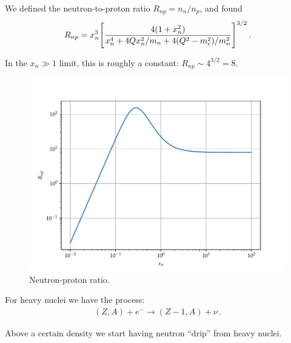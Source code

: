 \documentclass[main.tex]{subfiles}
\begin{document}

We defined the neutron-to-proton ratio \(R_{np} = n_n / n_p\), and found 
%
\begin{align}
R_{np} = x_n^3 \qty[\frac{4 (1 + x_n^2)}{x_n^4 + 4 Q x_n^2 / m_n + 4 (Q^2- m_e^2) / m_n^2}]^{3/2}
\,.
\end{align}

In the \(x_n \gg 1\) limit, this is roughly a constant: \(R_{np} \sim 4^{3/2} = 8\).

\begin{figure}[ht]
\centering
\includegraphics[width=\textwidth]{figures/neutron-proton-ratio}
\caption{Neutron-proton ratio.}
\label{fig:neutron-proton-ratio}
\end{figure}

For heavy nuclei we have the process:
%
\begin{align}
(Z, A) + e^{-} \to (Z-1, A) + \nu 
\,.
\end{align}

Above a certain density we start having neutron ``drip'' from heavy nuclei.
\end{document}
